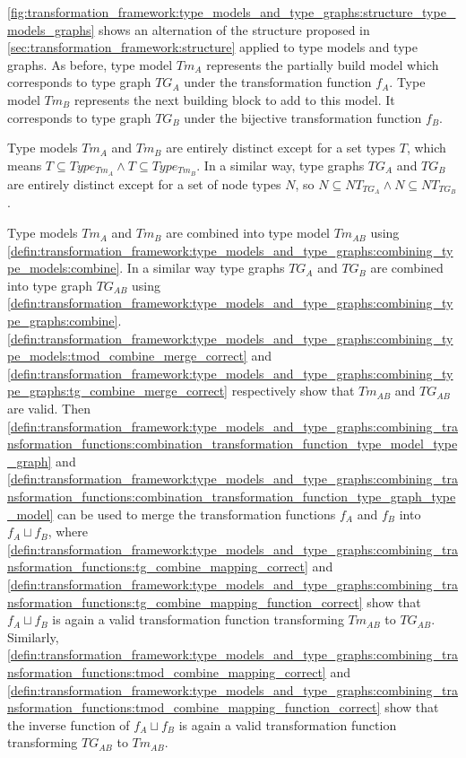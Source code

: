 \cref{fig:transformation_framework:type_models_and_type_graphs:structure_type_models_graphs} shows an alternation of the structure proposed in \cref{sec:transformation_framework:structure} applied to type models and type graphs. As before, type model $Tm_A$ represents the partially build model which corresponds to type graph $TG_A$ under the transformation function $f_A$. Type model $Tm_B$ represents the next building block to add to this model. It corresponds to type graph $TG_B$ under the bijective transformation function $f_B$.

Type models $Tm_A$ and $Tm_B$ are entirely distinct except for a set types $T$, which means $T \subseteq Type_{Tm_A} \land T \subseteq Type_{Tm_B}$. In a similar way, type graphs $TG_A$ and $TG_B$ are entirely distinct except for a set of node types $N$, so $N \subseteq NT_{TG_A} \land N \subseteq NT_{TG_B}$.

Type models $Tm_A$ and $Tm_B$ are combined into type model $Tm_{AB}$ using \cref{defin:transformation_framework:type_models_and_type_graphs:combining_type_models:combine}. In a similar way type graphs $TG_A$ and $TG_B$ are combined into type graph $TG_{AB}$ using \cref{defin:transformation_framework:type_models_and_type_graphs:combining_type_graphs:combine}. \cref{defin:transformation_framework:type_models_and_type_graphs:combining_type_models:tmod_combine_merge_correct} and \cref{defin:transformation_framework:type_models_and_type_graphs:combining_type_graphs:tg_combine_merge_correct} respectively show that $Tm_{AB}$ and $TG_{AB}$ are valid. Then \cref{defin:transformation_framework:type_models_and_type_graphs:combining_transformation_functions:combination_transformation_function_type_model_type_graph} and \cref{defin:transformation_framework:type_models_and_type_graphs:combining_transformation_functions:combination_transformation_function_type_graph_type_model} can be used to merge the transformation functions $f_A$ and $f_B$ into $f_{A} \sqcup f_{B}$, where \cref{defin:transformation_framework:type_models_and_type_graphs:combining_transformation_functions:tg_combine_mapping_correct} and \cref{defin:transformation_framework:type_models_and_type_graphs:combining_transformation_functions:tg_combine_mapping_function_correct} show that $f_{A} \sqcup f_{B}$ is again a valid transformation function transforming $Tm_{AB}$ to $TG_{AB}$. Similarly, \cref{defin:transformation_framework:type_models_and_type_graphs:combining_transformation_functions:tmod_combine_mapping_correct} and \cref{defin:transformation_framework:type_models_and_type_graphs:combining_transformation_functions:tmod_combine_mapping_function_correct} show that the inverse function of $f_{A} \sqcup f_{B}$ is again a valid transformation function transforming $TG_{AB}$ to $Tm_{AB}$.



